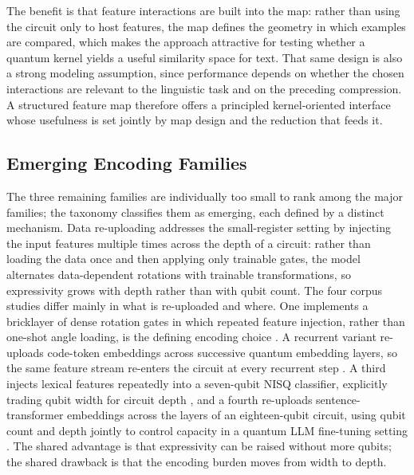 \documentclass{ieeeaccess}
\begin{document}
The benefit is that feature interactions are built into the map: rather than using the circuit only to host features, the map defines the geometry in which examples are compared, which makes the approach attractive for testing whether a quantum kernel yields a useful similarity space for text. That same design is also a strong modeling assumption, since performance depends on whether the chosen interactions are relevant to the linguistic task and on the preceding compression. A structured feature map therefore offers a principled kernel-oriented interface whose usefulness is set jointly by map design and the reduction that feeds it.

\subsection{Emerging Encoding Families}
\label{subsec:other_encoding_interfaces}

The three remaining families are individually too small to rank among the major families; the taxonomy classifies them as emerging, each defined by a distinct mechanism. Data re-uploading addresses the small-register setting by injecting the input features multiple times across the depth of a circuit: rather than loading the data once and then applying only trainable gates, the model alternates data-dependent rotations with trainable transformations, so expressivity grows with depth rather than with qubit count. The four corpus studies differ mainly in what is re-uploaded and where. One implements a bricklayer of dense rotation gates in which repeated feature injection, rather than one-shot angle loading, is the defining encoding choice \cite{hamilton_characterizing_2023}. A recurrent variant re-uploads code-token embeddings across successive quantum embedding layers, so the same feature stream re-enters the circuit at every recurrent step \cite{song_recurrent_2024}. A third injects lexical features repeatedly into a seven-qubit NISQ classifier, explicitly trading qubit width for circuit depth \cite{silver_lexiql_2024}, and a fourth re-uploads sentence-transformer embeddings across the layers of an eighteen-qubit circuit, using qubit count and depth jointly to control capacity in a quantum LLM fine-tuning setting \cite{kim_quantum_2025}. The shared advantage is that expressivity can be raised without more qubits; the shared drawback is that the encoding burden moves from width to depth.
\end{document}
